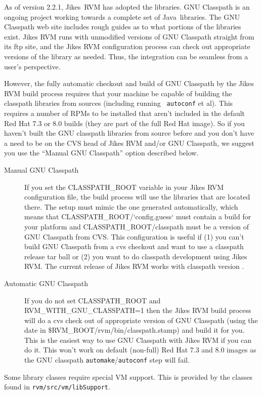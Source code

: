  As of version 2.2.1, Jikes\JikesTMFootnote\ RVM has adopted the
 libraries.  GNU
Classpath is an ongoing project working towards a complete set of
Java\JavaTMFootnote\ libraries.  The GNU Classpath web site includes
rough guides as to what portions of the libraries exist.  Jikes RVM
runs with unmodified versions of GNU Classpath straight from its ftp
site, and the Jikes RVM configuration process can check out
appropriate versions of the library as needed.  Thus, the integration
can be seamless from a user's perspective.

However, the fully automatic checkout and build of GNU Classpath by
the Jikes RVM build process requires that your machine be capable of
building the classpath libraries from sources (including running {\tt
autoconf} et al).  This requires a number of RPMs to be installed that
aren't included in the default Red Hat 7.3 or 8.0 builds (they are
part of the full Red Hat image).  So if you haven't built the GNU
classpath libraries from source before and you don't have a need to be
on the CVS head of Jikes RVM and/or GNU Classpath, we suggest you use
the ``Manual GNU Classpath'' option described below.

\begin{description}
\item[Manual GNU Classpath] If you set the CLASSPATH\_ROOT variable in
your Jikes RVM configuration file, the build process will use the
libraries that are located there.  The setup must mimic the one
generated automatically, which means that
CLASSPATH\_ROOT/`config.guess` must contain a build for your platform
and CLASSPATH\_ROOT/classpath must be a version of GNU Classpath from
CVS.  This configuration is useful if (1) you can't build GNU
Classpath from a cvs checkout and want to use a classpath release tar
ball or (2) you want to do classpath development using Jikes RVM. The
current release of Jikes RVM works with classpath version \classpathversion.

\item[Automatic GNU Classpath] If you do not set CLASSPATH\_ROOT and 
RVM\_WITH\_GNU\_CLASSPATH=1 then the Jikes RVM build process will do a
cvs check out of appropriate version of GNU Classpath (using the date
in \$RVM\_ROOT/rvm/bin/classpath.stamp) and build it for you.  This is
the easiest way to use GNU Classpath with Jikes RVM if you can do it.
This won't work on default (non-full) Red Hat 7.3 and 8.0 images
as the GNU classpath {\tt automake}/{\tt autoconf} step will fail.

\end{description}

Some library classes require special VM support.  This is provided by
the classes found in {\tt rvm/src/vm/libSupport}. 

\JavaTMFooter
\JikesTMFooter
